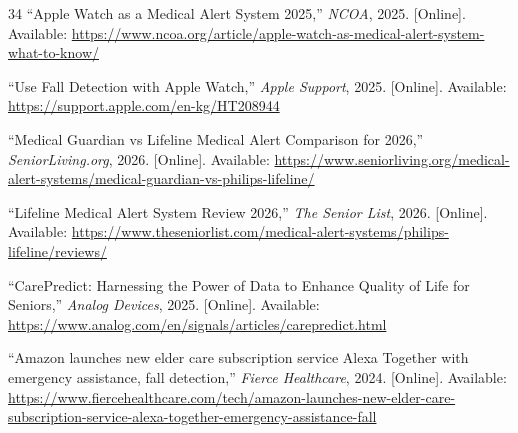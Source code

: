 \documentclass[conference]{IEEEtran}
\begin{document}
\begin{thebibliography}{34}
``Apple Watch as a Medical Alert System 2025,'' \textit{NCOA}, 2025. [Online]. Available: \url{https://www.ncoa.org/article/apple-watch-as-medical-alert-system-what-to-know/}

``Use Fall Detection with Apple Watch,'' \textit{Apple Support}, 2025. [Online]. Available: \url{https://support.apple.com/en-kg/HT208944}

``Medical Guardian vs Lifeline Medical Alert Comparison for 2026,'' \textit{SeniorLiving.org}, 2026. [Online]. Available: \url{https://www.seniorliving.org/medical-alert-systems/medical-guardian-vs-philips-lifeline/}

``Lifeline Medical Alert System Review 2026,'' \textit{The Senior List}, 2026. [Online]. Available: \url{https://www.theseniorlist.com/medical-alert-systems/philips-lifeline/reviews/}

``CarePredict: Harnessing the Power of Data to Enhance Quality of Life for Seniors,'' \textit{Analog Devices}, 2025. [Online]. Available: \url{https://www.analog.com/en/signals/articles/carepredict.html}

``Amazon launches new elder care subscription service Alexa Together with emergency assistance, fall detection,'' \textit{Fierce Healthcare}, 2024. [Online]. Available: \url{https://www.fiercehealthcare.com/tech/amazon-launches-new-elder-care-subscription-service-alexa-together-emergency-assistance-fall}

\end{thebibliography}
\end{document}
